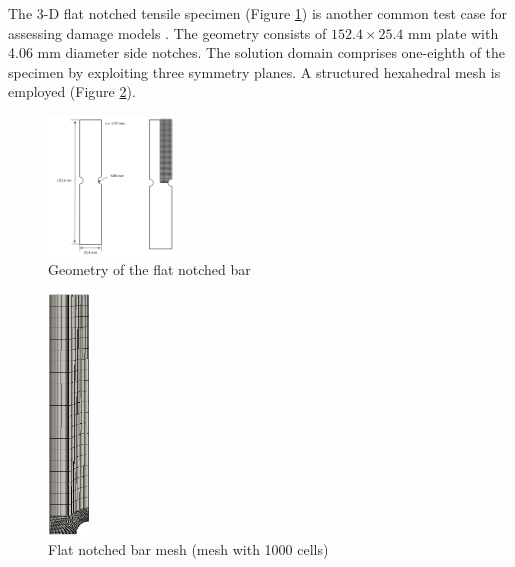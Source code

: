 \documentclass[sn-mathphys,Numbered,draft]{sn-jnl}%
\begin{document}
The 3-D flat notched tensile specimen (Figure \ref{fig:flat_bar_geom}) is another common test case for assessing damage models \citep{borden_phase-field_2016, eldahshan_phase_2021}.
The geometry consists of $152.4 \times 25.4$ \si{\milli\meter} plate with 4.06 \si{\milli\meter} diameter side notches.
The solution domain comprises one-eighth of the specimen by exploiting three symmetry planes.
A structured hexahedral mesh is employed (Figure \ref{fig:flat_bar_mesh}).

\begin{figure}[htb] \label{fig:flat_bar_geom}
\begin{center}
	\includegraphics[width=0.3\textwidth]{./Figures/finiteVolumeImplementation/inhomogenousDeformation/flatNotchedTensile.png}
\caption{Geometry of the flat notched bar}
\end{center}
\end{figure}

\begin{figure}[htbp]
	\centering
		\includegraphics[width=0.1\textwidth]{./Figures/finiteVolumeImplementation/inhomogenousDeformation/bordenMesh.png}
		
		
		\caption{Flat notched bar mesh (mesh with 1000 cells)}
	\label{fig:flat_bar_mesh}
\end{figure}
\end{document}
